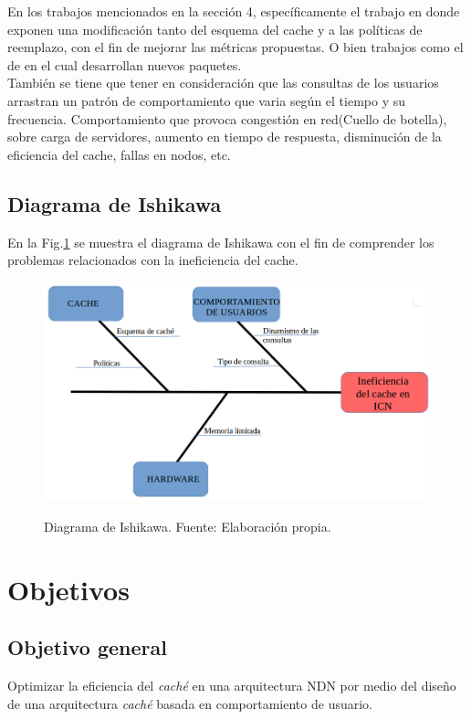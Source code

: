 \documentclass[12pt]{ociamthesis}  %
\begin{document}
En los trabajos mencionados en la sección 4, específicamente el trabajo \cite{tarnoi2014performance} en donde exponen una modificación tanto del esquema del cache y a las políticas de reemplazo, con el fin de mejorar las métricas propuestas. O bien trabajos como el de \cite{mun2017cache} en el cual desarrollan nuevos paquetes.\\

También se tiene que tener en consideración que las consultas de los usuarios arrastran un patrón de comportamiento que varia según el tiempo y su frecuencia. Comportamiento que provoca congestión en red(Cuello de botella), sobre carga de servidores, aumento en tiempo de respuesta, disminución de la eficiencia del cache, fallas en nodos, etc.\\

\subsection{Diagrama de Ishikawa}
En la Fig.\ref{diagrama_ishikawa} se muestra el diagrama de Ishikawa con el fin de
comprender los problemas relacionados con la ineficiencia del cache.

\begin{figure}[!htb]
	\centering
	\includegraphics[width=12cm]{Imagenes/Diagrama_ishikawa}\\
	\caption{Diagrama de Ishikawa. Fuente: Elaboración propia.}
	\label{diagrama_ishikawa}
\end{figure}
\section{Objetivos}
\subsection{Objetivo general}
Optimizar la eficiencia del \textit{caché} en una arquitectura NDN por medio del diseño de una arquitectura \textit{caché} basada en comportamiento de usuario.
\end{document}
